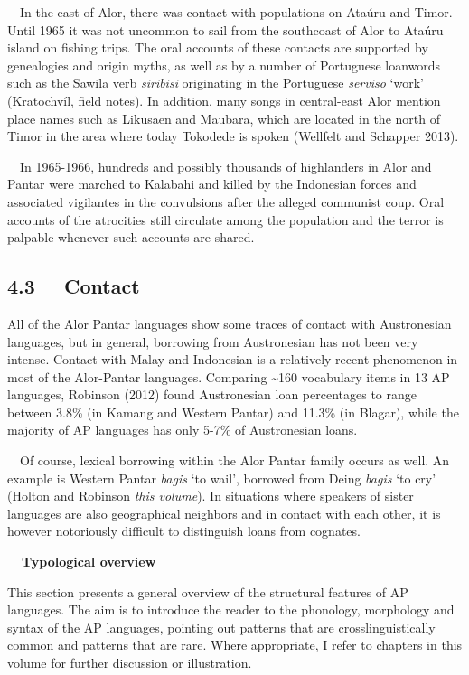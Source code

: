 \ \ In the east of Alor, there was contact with populations on Ata\'uru and Timor. Until 1965 it was not uncommon to sail from the southcoast of Alor to Ata\'uru island on fishing trips. The oral accounts of these contacts are supported by genealogies and origin myths, as well as by a number of Portuguese loanwords such as the Sawila verb \textit{siribisi} originating in the Portuguese \textit{serviso} {\textquoteleft}work{\textquoteright} (Kratochv\'il, field notes). In addition, many songs in central-east Alor mention place names such as Likusaen and Maubara, which are located in the north of Timor in the area where today Tokodede is spoken (Wellfelt and Schapper 2013).

\ \ In 1965-1966, hundreds and possibly thousands of highlanders in Alor and Pantar were marched to Kalabahi and killed by the Indonesian forces and associated vigilantes in the convulsions after the alleged communist coup. Oral accounts of the atrocities still circulate among the population and the terror is palpable whenever such accounts are shared.

\subsection[4.3 \ \ Contact]{4.3 \ \ Contact}
All of the Alor Pantar languages show some traces of contact with Austronesian languages, but in general, borrowing from Austronesian has not been very intense. Contact with Malay and Indonesian is a relatively recent phenomenon in most of the Alor-Pantar languages. Comparing \~{}160 vocabulary items in 13 AP languages, Robinson (2012) found Austronesian loan percentages to range between 3.8\% (in Kamang and Western Pantar) and 11.3\% (in Blagar), while the majority of AP languages has only 5-7\% of Austronesian loans.

\ \ Of course, lexical borrowing within the Alor Pantar family occurs as well. An example is Western Pantar \textit{bagis }{\textquoteleft}to wail{\textquoteright}, borrowed from Deing \textit{bagis }{\textquoteleft}to cry{\textquoteright} (Holton and Robinson \textit{this volume}). In situations where speakers of sister languages are also geographical neighbors and in contact with each other, it is however notoriously difficult to distinguish loans from cognates.

{\bfseries
\ \ Typological overview}

This section presents a general overview of the structural features of AP languages. The aim is to introduce the reader to the phonology, morphology and syntax of the AP languages, pointing out patterns that are crosslinguistically common and patterns that are rare. Where appropriate, I refer to chapters in this volume for further discussion or illustration. 

